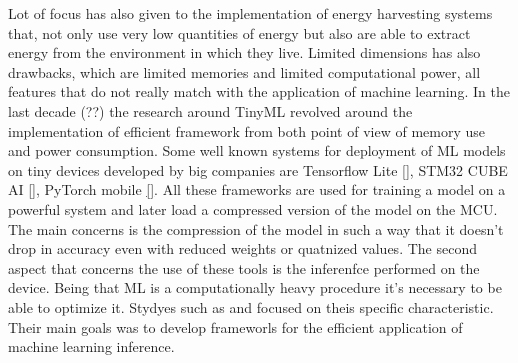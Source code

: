 \documentclass[12pt]{report}
\begin{document}
Lot of focus has also given to the implementation of energy harvesting systems that, not only use very low quantities of energy but also are able to extract energy from the environment in which they live. Limited dimensions has also drawbacks, which are limited memories and limited computational power, all features that do not really match with the application of machine learning. 
In the last decade (??) the research around TinyML revolved around the implementation of efficient framework from both point of view of memory use and power consumption. Some well known systems for deployment of ML models on tiny devices developed by big companies are Tensorflow Lite \ref{}, STM32 CUBE AI \ref{}, PyTorch mobile \ref{}. All these frameworks are used for training a model on a powerful system and later load a compressed version of the model on the MCU. The main concerns is the compression of the model in such a way that it doesn't drop in accuracy even with reduced weights or quatnized values. The second aspect that concerns the use of these tools is the inferenfce performed on the device. Being that ML is a computationally heavy procedure it's necessary to be able to optimize it. Stydyes such as \autocite{} and \autocite{} focused on theis specific characteristic. Their main goals was to develop frameworls for the efficient application of machine learning inference.
\end{document}
